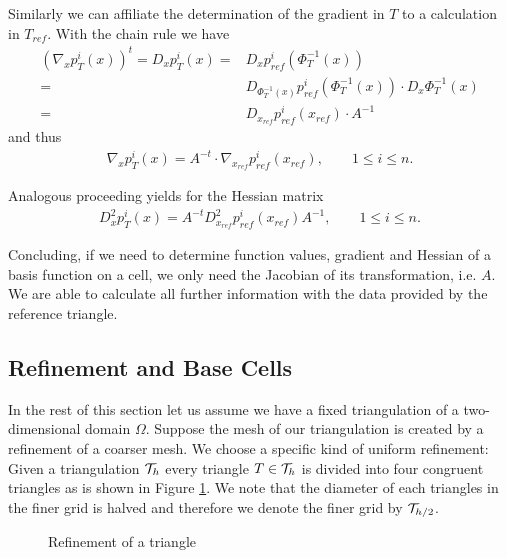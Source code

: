 \begin{example}
Similarly we can affiliate the determination of the gradient in $T$ to a calculation in $T_{ref}$. With the chain rule we have
\begin{align*}
	\left(\nabla_x p_T^i(x)\right)^t = D_x p_T^i(x) =& D_x p^i_{ref}(\Phi_T^{-1}(x)) \\
	  =& D_{\Phi_T^{-1}(x)}p^i_{ref}(\Phi_T^{-1}(x)) \cdot D_x  \Phi_T^{-1}(x) \\
	  =& D_{x_{ref}}p^i_{ref}(x_{ref}) \cdot  A^{-1}
\end{align*}
and thus
\begin{align}
	\nabla_x p_T^i(x) = A^{-t} \cdot \nabla_{x_{ref}}p^i_{ref}(x_{ref}), \qquad 1 \leq i \leq n. \label{eq: ref gradient}
\end{align}

Analogous proceeding yields for the Hessian matrix
\begin{align}
D_x^2p_T^i(x) = A^{-t} D_{x_{ref}}^2p^i_{ref}(x_{ref})  A^{-1}, \qquad 1 \leq i \leq n.
\end{align}

Concluding, if we need to determine function values, gradient and Hessian of a basis function on a cell, we only need the Jacobian of its transformation, i.e. $A$. We are able to calculate all further information with the data provided by the reference triangle.
\end{example}

\subsection{Refinement and Base Cells}\label{subsec: refinement and base cells}
In the rest of this section let us assume we have a fixed triangulation of a two-dimensional domain $\Omega$. 
Suppose the mesh of our triangulation is created by a refinement of a coarser mesh. We choose a specific kind of uniform refinement: Given a triangulation $\mathcal{T}_h$ every triangle $T \in \mathcal{T}_h$ is divided into four congruent triangles as is shown in Figure \ref{pic: refinement}. We note that the diameter of each triangles in the finer grid is halved and therefore we denote the finer grid by $\mathcal{T}_{h/2}$. %

\begin{figure}[h]

\caption{Refinement of a triangle}
 \label{pic: refinement}
\end{figure}

